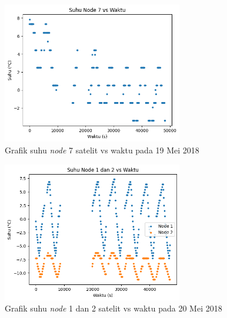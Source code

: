 \begin{figure}[H]
\setlength{}
\begin{center}
\includegraphics[width=0.7\textwidth]{fig/raw_node7_temp_2018-05-19.png}
	\caption{Grafik suhu \textit{node} 7 satelit vs waktu pada 19 Mei 2018}
\label{fig:rawtemp719}
\end{center}
\end{figure}

\begin{figure}[H]
\setlength{}
\begin{center}
\includegraphics[width=0.7\textwidth]{fig/raw_node12_temp_2018-05-20.png}
	\caption{Grafik suhu \textit{node} 1 dan 2 satelit vs waktu pada 20 Mei 2018}
\label{fig:rawtemp1220}
\end{center}
\end{figure}

